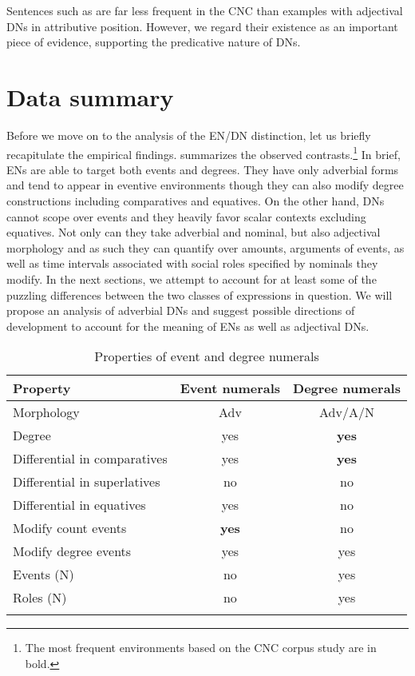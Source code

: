 \documentclass[output=paper,
modfonts,
hidelinks,
newtxmath
]{langscibook}
\begin{document}
\noindent Sentences such as  are far less frequent in the CNC than examples with adjectival DNs in attributive position. However, we regard their existence as an important piece of evidence, supporting the predicative nature of DNs.

\section{Data summary}\label{data-summary}

Before we move on to the analysis of the EN/DN distinction, let us briefly recapitulate the empirical findings.  summarizes the observed contrasts.\footnote{The most frequent environments based on the CNC corpus study are in bold.} In brief, ENs are able to target both events and degrees. They have only adverbial forms and tend to appear in eventive environments though they can also modify degree constructions including comparatives and equatives. On the other hand, DNs cannot scope over events and they heavily favor scalar contexts excluding equatives. Not only can they take adverbial and nominal, but also adjectival morphology and as such they can quantify over amounts, arguments of events, as well as time intervals associated with social roles specified by nominals they modify. In the next sections, we attempt to account for at least some of the puzzling differences between the two classes of expressions in question. We will propose an analysis of adverbial DNs and suggest possible directions of development to account for the meaning of ENs as well as adjectival DNs.

\begin{table}[t]
\caption{Properties of event and degree numerals}\label{table:properties}
\begin{tabular}{lcc}
\lsptoprule
Property & Event numerals & Degree numerals\tabularnewline
\midrule
Morphology & Adv & Adv/A/N\tabularnewline
Degree & yes & \textbf{yes}\tabularnewline
Differential in comparatives & yes & \textbf{yes}\tabularnewline
Differential in superlatives & no & no\tabularnewline
Differential in equatives & yes & no\tabularnewline
Modify count events & \textbf{yes} & no\tabularnewline
Modify degree events & yes & yes\tabularnewline
Events (N) & no & yes\tabularnewline
Roles (N) & no & yes\tabularnewline
\lspbottomrule
\end{tabular}
\end{table}
\end{document}
